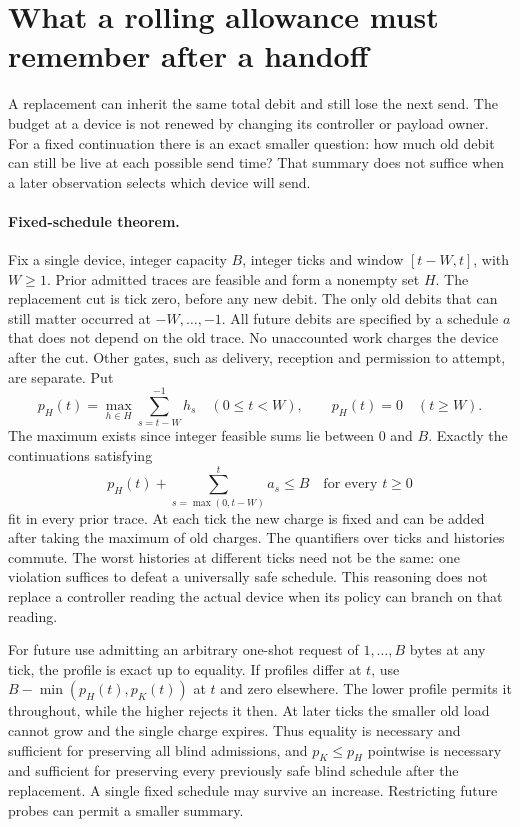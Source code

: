 \documentclass{article}
\begin{document}
\section*{What a rolling allowance must remember after a handoff}
A replacement can inherit the same total debit and still lose the next send. The budget at a device is not renewed by changing its controller or payload owner. For a fixed continuation there is an exact smaller question: how much old debit can still be live at each possible send time? That summary does not suffice when a later observation selects which device will send.

\paragraph{Fixed-schedule theorem.}
Fix a single device, integer capacity $B$, integer ticks and window $[t-W,t]$, with $W\geq 1$. Prior admitted traces are feasible and form a nonempty set $H$. The replacement cut is tick zero, before any new debit. The only old debits that can still matter occurred at $-W,\dots,-1$. All future debits are specified by a schedule $a$ that does not depend on the old trace. No unaccounted work charges the device after the cut. Other gates, such as delivery, reception and permission to attempt, are separate. Put
\[
p_H(t)=\max_{h\in H}\sum_{s=t-W}^{-1}h_s \quad (0\le t<W),
\qquad p_H(t)=0 \quad(t\ge W).
\]
The maximum exists since integer feasible sums lie between $0$ and $B$. Exactly the continuations satisfying
\[
p_H(t)+\sum_{s=\max(0,t-W)}^t a_s\le B\quad\text{for every }t\ge0
\]
fit in every prior trace. At each tick the new charge is fixed and can be added after taking the maximum of old charges. The quantifiers over ticks and histories commute. The worst histories at different ticks need not be the same: one violation suffices to defeat a universally safe schedule. This reasoning does not replace a controller reading the actual device when its policy can branch on that reading.

For future use admitting an arbitrary one-shot request of $1,\dots,B$ bytes at any tick, the profile is exact up to equality. If profiles differ at $t$, use $B-\min(p_H(t),p_K(t))$ at $t$ and zero elsewhere. The lower profile permits it throughout, while the higher rejects it then. At later ticks the smaller old load cannot grow and the single charge expires. Thus equality is necessary and sufficient for preserving all blind admissions, and $p_K\le p_H$ pointwise is necessary and sufficient for preserving every previously safe blind schedule after the replacement. A single fixed schedule may survive an increase. Restricting future probes can permit a smaller summary.
\end{document}
